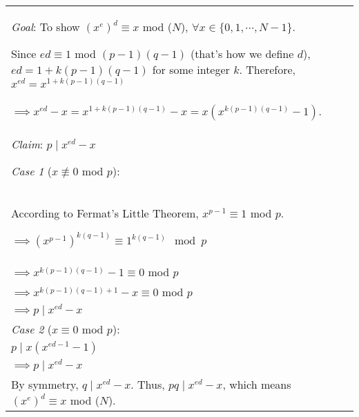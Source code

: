 {\tabulinesep=1mm
\begin{tabu}{|p{16cm} |}
\hline
\textit{Goal}: To show $(x^e)^d \equiv x$ mod ($N$), $\forall x \in \{0, 1, \cdots, N-1\}$. 

Since $ed \equiv 1$ mod $(p-1)(q-1)$ (that's how we define $d$), 
$ed = 1 + k(p-1)(q-1)$ for some integer $k$. 
Therefore, $x^{ed} = x^{1 + k(p-1)(q-1)}$\\
$\implies x^{ed} - x = x^{1 + k(p-1)(q-1)} - x = x(x^{k(p-1)(q-1)} - 1)$. \\ 
\textit{Claim}: $p \mid x^{ed} - x$

\textit{Case 1} ($x \not\equiv 0$ mod $p$): \\
According to Fermat's Little Theorem, $x^{p-1} \equiv 1$ mod $p$. 


$\implies (x^{p-1})^{k(q-1)} \equiv 1^{k(q-1)} \mod p$ \\
$\implies x^{k(p-1)(q-1)} - 1 \equiv 0$ mod $p$  \\
$\implies x^{k(p-1)(q-1)+1} - x \equiv 0$ mod $p$\\
$\implies p \mid x^{ed} - x$\\
\textit{Case 2} ($x \equiv 0$ mod $p$): \\
$p \mid x(x^{ed - 1} - 1)$ \\ 
$\implies p \mid x^{ed} - x$\\
By symmetry, $q \mid x^{ed} - x$. Thus, $pq \mid x^{ed} - x$, which means $(x^e)^d \equiv x$ mod ($N$). \\
\hline
\end{tabu}
}